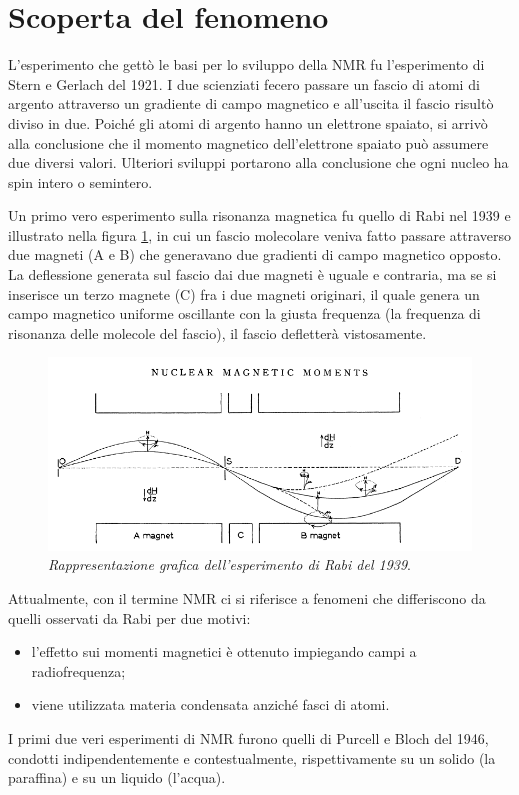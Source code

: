\documentclass{report}
\newcommand{\figref}[1]{figura \ref{#1}}
\numberwithin{equation}{section}
\numberwithin{figure}{section}
\begin{document}
\section{Scoperta del fenomeno}
L'esperimento che gettò le basi per lo sviluppo della NMR fu l'esperimento di Stern e Gerlach del 1921. I due scienziati fecero passare un fascio di atomi di argento attraverso un gradiente di campo magnetico e all'uscita il fascio risultò diviso in due. Poiché gli atomi di argento hanno un elettrone spaiato, si arrivò alla conclusione che il momento magnetico dell'elettrone spaiato può assumere due diversi valori. Ulteriori sviluppi portarono alla conclusione che ogni nucleo ha spin intero o semintero.

Un primo vero esperimento sulla risonanza magnetica fu quello di Rabi nel 1939 e illustrato nella \figref{fig:rabi}, in cui un fascio molecolare veniva fatto passare attraverso due magneti (A e B) che generavano due gradienti di campo magnetico opposto. La deflessione generata sul fascio dai due magneti è uguale e contraria, ma se si inserisce un terzo magnete (C) fra i due magneti originari, il quale genera un campo magnetico uniforme oscillante con la giusta frequenza (la frequenza di risonanza delle molecole del fascio), il fascio defletterà vistosamente. 

\begin{figure}[htp]
    \centering
    \includegraphics[scale=0.6]{immagini/rabi.png}
    \caption{\textit{Rappresentazione grafica dell'esperimento di Rabi del 1939}.}
    \label{fig:rabi}
\end{figure}

Attualmente, con il termine NMR ci si riferisce a fenomeni che differiscono da quelli osservati da Rabi per due motivi:
\begin{itemize}[label=$-$]
    \item l'effetto sui momenti magnetici è ottenuto impiegando campi a radiofrequenza;
    \item viene utilizzata materia condensata anziché fasci di atomi.
\end{itemize}
I primi due veri esperimenti di NMR furono quelli di Purcell e Bloch del 1946, condotti indipendentemente e contestualmente, rispettivamente su un solido (la paraffina) e su un liquido (l'acqua).
\end{document}
